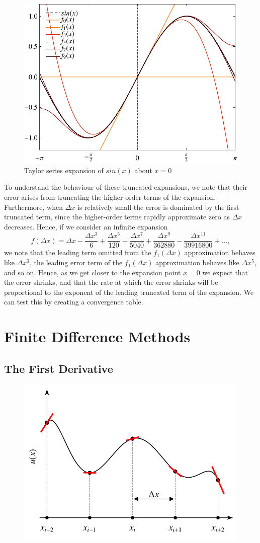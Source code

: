 \begin{figure}[htbp]
	\centering
	\includegraphics[width=0.6\linewidth]{Pictures/ch9_taylor_series_sin}
	\caption{Taylor series expansion of $sin(x)$ about $x=0$}
	\label{fig:taylor_series}
\end{figure}

To understand the behaviour of these truncated expansions, we note that their error arises from truncating the higher-order terms of the expansion. Furthermore, when $\Delta x$ is relatively small the error is dominated by the first truncated term, since the higher-order terms rapidly approximate zero as $\Delta x$ decreases. Hence, if we consider an infinite expansion
\begin{equation}
	f(\Delta x) = \Delta x - \frac{\Delta x^3}{6} + \frac{\Delta x^5}{120} - \frac{\Delta x^7}{5040} + \frac{\Delta x^9}{362880} - \frac{\Delta x^{11}}{39916800} + \hdots,
\end{equation}
we note that the leading term omitted from the $f_1(\Delta x)$ approximation behaves like $\Delta x^3$, the leading error term of the $f_1(\Delta x)$ approximation behaves like $\Delta x^5$, and so on. Hence, as we get closer to the expansion point $x=0$ we expect that the error shrinks, and that the rate at which the error shrinks will be proportional to the exponent of the leading truncated term of the expansion. We can test this by creating a convergence table.
	
\chapter{Finite Difference Methods}
\section{The First Derivative}

\begin{figure}[htbp]
	\centering
	\includegraphics[width=0.6\linewidth]{Pictures/ch10_fd_scheme}
	\caption{}
	\label{fig:fd_scheme}
\end{figure}
	
